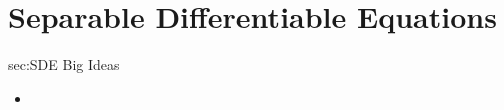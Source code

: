\chapter{Separable Differentiable Equations}
\label{chap:SDE}

\begin{bigideas}{sec:SDE Big Ideas}
\begin{itemize}
  \item 
\end{itemize}
\end{bigideas}